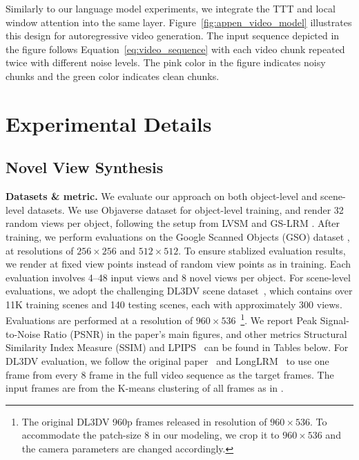 Similarly to our language model experiments, we integrate the TTT and local window attention into the same layer. Figure~\ref{fig:appen_video_model} illustrates this design for autoregressive video generation. The input sequence depicted in the figure follows Equation~\ref{eq:video_sequence} with each video chunk repeated twice with different noise levels. The pink color in the figure indicates noisy chunks and the green color indicates clean chunks. 




\section{Experimental Details}
\label{sec:appen_experiment_details}

\subsection{Novel View Synthesis}
\label{sec:appen_nvs_details}

\noindent\textbf{Datasets \& metric.} We evaluate our approach on 
both object-level and scene-level datasets.
We use Objaverse dataset \cite{deitke2023objaverse} for object-level training, 
and render 32 random views per object,   
following the setup from LVSM \cite{jin2024lvsm} and GS-LRM \cite{zhang2024gs}.  
After training, we perform evaluations on the Google Scanned Objects (GSO) dataset \cite{downs2022google}, at resolutions of $256\times256$ and $512\times512$.
To ensure stablized evaluation results, we render at fixed view points instead of random view points as in training.
Each evaluation involves 4–48 input views and 8 novel views per object.
For scene-level evaluations, we adopt the challenging DL3DV scene dataset~\cite{ling2024dl3dv}, which contains over 11K training scenes and 140 testing scenes, each with approximately 300 views.
Evaluations are performed at a resolution of $960\times536$~\footnote{The original DL3DV 960p frames released in resolution of $960\times536$. To accommodate the patch-size $8$ in our modeling, we crop it to $960\times536$ and the camera parameters are changed accordingly.  }.
We report Peak Signal-to-Noise Ratio (PSNR) in the paper's main figures, and other metrics Structural Similarity Index Measure (SSIM) and LPIPS~\cite{zhang2018unreasonable} can be found in Tables below.
For DL3DV evaluation, we follow the original paper~\cite{ling2024dl3dv} and LongLRM~\cite{ziwen2024long} to use one frame from every $8$ frame in the full video sequence as the target frames.
The input frames are from the K-means clustering of all frames as in \cite{ziwen2024long}.


